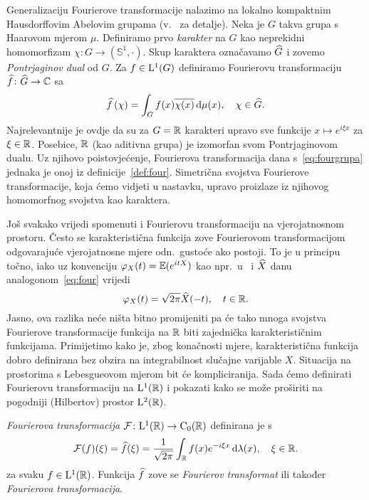 \documentclass[main.tex]{subfiles}
\begin{document}
Generalizaciju Fourierove transformacije nalazimo na lokalno kompaktnim Hausdorffovim Abelovim grupama (v.~\cite[,5.2]{gogic} za detalje).
Neka je \( G \) takva grupa s Haarovom mjerom \( \mu \).
Definiramo prvo \emph{karakter} na \( G \) kao neprekidni homomorfizam \( \chi \colon G \to \left( \mathbb S^1, \cdot \right) \).
Skup karaktera označavamo \( \widehat{G} \) i zovemo \emph{Pontrjaginov dual} od \( G \). Za
\( f \in \mathrm{L}^1(G) \) definiramo Fourierovu transformaciju \( \widehat{f} \colon \widehat{G} \to \mathbb{C} \) sa
\begin{equation}\label{eq:fourgrupa}
	\widehat{f} \left( \chi \right) =
	\int_G f(x) \overline{\chi(x)} \,\mathrm d \mu(x), \quad \chi \in \widehat{G}.
\end{equation}
Najrelevantnije je ovdje da su za \( G = \mathbb{R} \) karakteri upravo sve
funkcije \( x \mapsto e^{i\xi x} \) za \( \xi \in \mathbb{R} \).
Posebice, \( \mathbb{R} \) (kao aditivna grupa) je izomorfan
svom Pontrjaginovom dualu. Uz njihovo poistovjećenje,
Fourierova transformacija dana s~\eqref{eq:fourgrupa}
jednaka je onoj iz definicije~\ref{def:four}.
Simetrična svojstva Fourierove transformacije, koja ćemo vidjeti u nastavku, upravo
proizlaze iz njihovog homomorfnog svojstva kao karaktera.

Još svakako vrijedi spomenuti i Fourierovu transformaciju na vjerojatnosnom prostoru.
Često se karakteristična funkcija zove Fourierovom transformacijom odgovarajuće
vjerojatnosne mjere odn.\ gustoće ako postoji.
To je u principu točno, iako uz konvenciju
\( \varphi_X(t)=\mathbb{E}(e^{itX}) \) kao npr.\ u~\cite[]{sarapa}
i \( \widehat{X} \) danu analogonom~\eqref{eq:four} vrijedi
\begin{equation}
	\varphi_X(t) = \sqrt{2\pi}\widehat{X}(-t), \quad t \in \mathbb{R}.
\end{equation}
Jasno, ova razlika neće ništa bitno promijeniti pa će tako
mnoga svojstva Fourierove trans\-formacije funkcija na \( \mathbb{R} \)
biti zajednička karakterističnim funkcijama. Primijetimo
kako je, zbog konačnosti mjere, karakteristična funkcija
dobro definirana bez obzira na integrabilnost slučajne
varijable \( X \). Situacija na prostorima s Lebesgueovom mjerom
bit će kompliciranija. Sada ćemo definirati
Fourierovu transformaciju na \( \mathrm{L}^1(\mathbb{R}) \) i pokazati
kako se može proširiti na pogodniji (Hilbertov)
prostor \( \mathrm{L}^2(\mathbb{R}) \).

\begin{definicija}\label{def:four}
	\emph{Fourierova transformacija} \( \mathcal F \colon \mathrm{L}^1(\mathbb{R}) \to \mathrm C_0(\mathbb{R}) \)
	definirana je s
	\begin{equation}\label{eq:four}
		\mathcal F(f)(\xi) = \widehat{f}(\xi) =
		\frac 1{\sqrt{2\pi}} \int_{\mathbb{R}} f(x)e^{-i\xi x} \,\mathrm d \lambda(x), \quad
		\xi \in \mathbb{R}.
	\end{equation}
	za svaku \( f \in \mathrm{L}^1(\mathbb{R}) \). Funkcija \( \widehat{f} \)
	zove se \emph{Fourierov transformat} ili također \emph{Fourierova trans\-for\-ma\-ci\-ja}.
\end{definicija}
\end{document}
